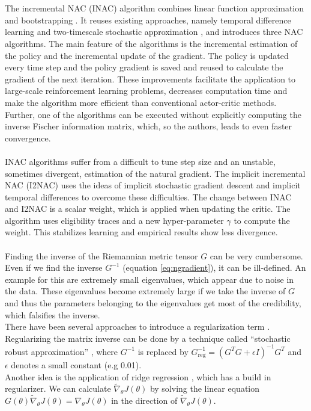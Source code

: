 \\\\
 The incremental NAC (INAC) algorithm combines linear function approximation and bootstrapping \citep{bhatnagar2008incremental}. It reuses existing approaches, namely temporal difference learning \citep{sutton2018reinforcement} and two-timescale stochastic approximation \citep{bhatnagar1998two}, and introduces three NAC algorithms. The main feature of the algorithms is the incremental estimation of the policy and the incremental update of the gradient. The policy is updated every time step and the policy gradient is saved and reused to calculate the gradient of the next iteration. These improvements facilitate the application to large-scale reinforcement learning problems, decreases computation time and make the algorithm more efficient than conventional actor-critic methods. Further, one of the algorithms can be executed without explicitly computing the inverse Fischer information matrix, which, so the authors, leads to even faster convergence.
\\\\
 INAC algorithms suffer from a difficult to tune step size and an unstable, sometimes divergent, estimation of the natural gradient. The implicit incremental NAC (I2NAC) \citep{iwaki2019implicit} uses the ideas of implicit stochastic gradient descent \citep{toulis2014statistical} and implicit temporal differences \citep{tamar2014implicit} to overcome these difficulties. The change between INAC and I2NAC is a scalar weight, which is applied when updating the critic. The algorithm uses eligibility traces and a new hyper-parameter $\gamma$ to compute the weight. This stabilizes learning and empirical results show less divergence.
\\\\
 Finding the inverse of the Riemannian metric tensor $G$ can be very cumbersome. Even if we find the inverse $G^{-1}$ (equation \ref{eq:ngradient}), it can be ill-defined. An example for this are extremely small eigenvalues, which appear due to noise in the data. These eigenvalues become extremely large if we take the inverse of $G$ and thus the parameters belonging to the eigenvalues get most of the credibility, which falsifies the inverse.
\\
\indent There have been several approaches to introduce a regularization term \cite{sohl2012natural,witsch2011enhancing}. Regularizing the matrix inverse can be done by a technique called ``stochastic robust approximation'' \cite{boyd2004convex}, where $G^{-1}$ is replaced by \(G^{-1}_{\text{reg}} = \left( G^T G + \epsilon I \right)^{-1} G^T\) and $\epsilon$ denotes a small constant (e.g 0.01).
\\
\indent Another idea is the application of ridge regression \cite{hoerl1970ridge}, which has a build in regularizer. We can calculate $\widetilde{\nabla}_{\theta} J(\theta)$ by solving the linear equation \(G(\theta) \widetilde{\nabla}_{\theta} J(\theta) = \nabla_{\theta} J(\theta)\) in the direction of $\widetilde{\nabla}_{\theta} J(\theta)$.

